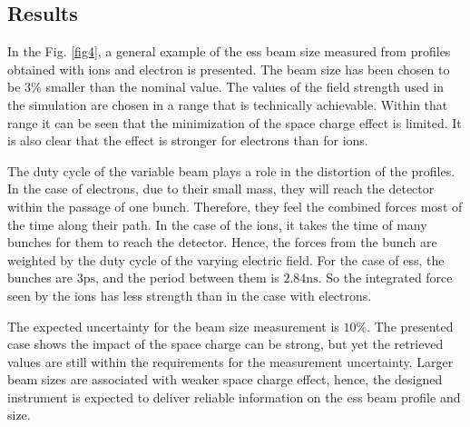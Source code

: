 \begin{refsection}
  \subsection{Results}


  

  In the Fig. \ref{fig4}, a general example of the \acrshort{ess} beam size measured from profiles obtained with ions and electron is presented. The beam size has been chosen to be $3\mathrm{\%}$ smaller than the nominal value. The values of the field strength used in the simulation are chosen in a range that is technically achievable. Within that range it can be seen that the minimization of the space charge effect is limited. It is also clear that the effect is stronger for electrons than for ions.

  The duty cycle of the variable beam plays a role in the distortion of the profiles. In the case of electrons, due to their small mass, they will reach the detector within the passage of one bunch. Therefore, they feel the combined forces most of the time along their path. In the case of the ions, it takes the time of many bunches for them to reach the detector. Hence, the forces from the bunch are weighted by the duty cycle of the varying electric field. For the case of \acrshort{ess}, the bunches are $3\mathrm{ps}$, and the period between them is $2.84\mathrm{ns}$. So the integrated force seen by the ions has less strength than in the case with electrons.

  The expected uncertainty for the beam size measurement is $10\mathrm{\%}$. The presented case shows the impact of the space charge can be strong, but yet the retrieved values are still within the requirements for the measurement uncertainty. Larger beam sizes are associated with weaker space charge effect, hence, the designed instrument is expected to deliver reliable information on the \acrshort{ess} beam profile and size.


\end{refsection}
